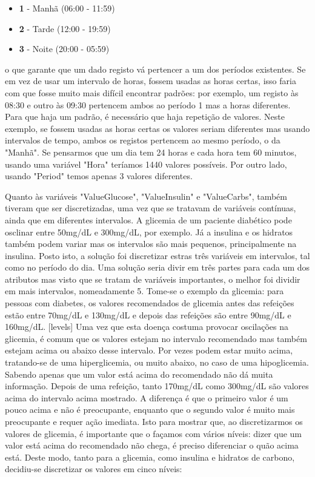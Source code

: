 \begin{itemize}
\item \textbf{1} - Manhã (06:00 - 11:59)
\item \textbf{2} - Tarde (12:00 - 19:59)
\item \textbf{3} - Noite (20:00 - 05:59)
\end{itemize}

o que garante que um dado registo vá pertencer a um dos períodos existentes. Se em vez de usar um intervalo de horas, fossem usadas as horas certas, isso faria com que fosse muito mais difícil encontrar padrões: por exemplo, um registo às 08:30 e outro às 09:30 pertencem ambos ao período 1 mas a horas diferentes. Para que haja um padrão, é necessário que haja repetição de valores. Neste exemplo, se fossem usadas as horas certas os valores seriam diferentes mas usando intervalos de tempo, ambos os registos pertencem ao mesmo período, o da "Manhã". Se pensarmos que um dia tem 24 horas e cada hora tem 60 minutos, usando uma variável "Hora" teríamos 1440 valores possíveis. Por outro lado, usando "Period" temos apenas 3 valores diferentes. 

Quanto às variáveis "Value\textunderscore Glucose", "Value\textunderscore Insulin" e "Value\textunderscore Carbs", também tiveram que ser discretizadas, uma vez que se tratavam de variáveis contínuas, ainda que em diferentes intervalos. A glicemia de um paciente diabético pode osclinar entre 50mg/dL e 300mg/dL, por exemplo. Já a insulina e os hidratos também podem variar mas os intervalos são mais pequenos, principalmente na insulina. 
Posto isto, a solução foi discretizar estras três variáveis em intervalos, tal como no período do dia. 
Uma solução seria divir em três partes para cada um dos atributos mas visto que se tratam de variáveis importantes, o melhor foi dividir em mais intervalos, nomeadamente 5.
Tome-se o exemplo da glicemia: para pessoas com diabetes, os valores recomendados de glicemia antes das refeições estão entre 70mg/dL e 130mg/dL e depois das refeições são entre 90mg/dL e 160mg/dL. [levels] Uma vez que esta doença costuma provocar oscilações na glicemia, é comum que os valores estejam no intervalo recomendado mas também estejam acima ou abaixo desse intervalo. Por vezes podem estar muito acima, tratando-se de uma hiperglicemia, ou muito abaixo, no caso de uma hipoglicemia. Sabendo apenas que um valor está acima do recomendado não dá muita informação. Depois de uma refeição, tanto 170mg/dL como 300mg/dL são valores acima do intervalo acima mostrado. A diferença é que o primeiro valor é um pouco acima e não é preocupante, enquanto que o segundo valor é muito mais preocupante e requer ação imediata. Isto para mostrar que, ao discretizarmos os valores de glicemia, é importante que o façamos com vários níveis: dizer que um valor está acima do recomendado não chega, é preciso diferenciar o quão acima está. Deste modo, tanto para a glicemia, como insulina e hidratos de carbono, decidiu-se discretizar os valores em cinco níveis:

